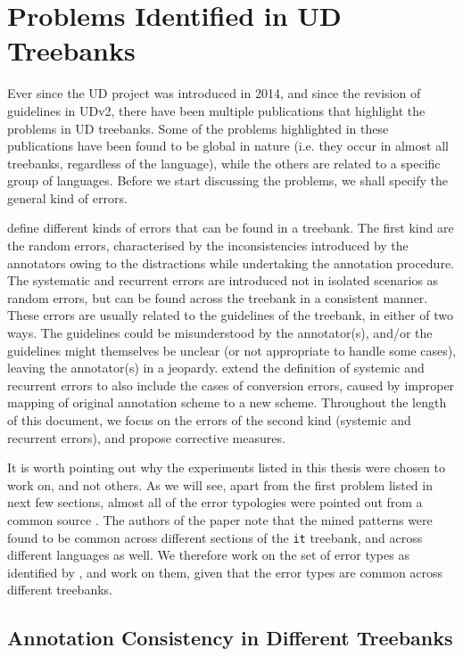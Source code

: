 \chapter{Problems Identified in UD Treebanks}
\label{sec:problems}

Ever since the UD project was introduced in 2014, and since the revision of guidelines in UDv2, there have been multiple publications that highlight the problems in UD treebanks. Some of the problems highlighted in these publications have been found to be global in nature (i.e. they occur in almost all treebanks, regardless of the language), while the others are related to a specific group of languages. Before we start discussing the problems, we shall specify the general kind of errors.

\cite{error-types} define different kinds of errors that can be found in a treebank. The first kind are the random errors, characterised by the inconsistencies introduced by the annotators owing to the distractions while undertaking the annotation procedure. The systematic and recurrent errors are introduced not in isolated scenarios as random errors, but can be found across the treebank in a consistent manner. These errors are usually related to the guidelines of the treebank, in either of two ways. The guidelines could be misunderstood by the annotator(s), and/or the guidelines might themselves be unclear (or not appropriate to handle some cases), leaving the annotator(s) in a jeopardy. \cite{alzetta2017dangerous} extend the definition of systemic and recurrent errors to also include the cases of conversion errors, caused by improper mapping of original annotation scheme to a new scheme. Throughout the length of this document, we focus on the errors of the second kind (systemic and recurrent errors), and propose corrective measures.

It is worth pointing out why the experiments listed in this thesis were chosen to work on, and not others. As we will see, apart from the first problem listed in next few sections, almost all of the error typologies were pointed out from a common source \citep{alzetta2017dangerous}. The authors of the paper note that the mined patterns were found to be common across different sections of the \verb|it| treebank, and across different languages as well. We therefore work on the set of error types as identified by \cite{alzetta2017dangerous}, and work on them, given that the error types are common across different treebanks.

\section{Annotation Consistency in Different Treebanks}
\label{sec:harmony}

